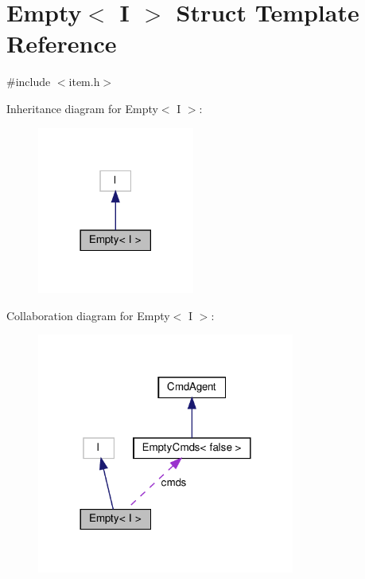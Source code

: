 \hypertarget{structEmpty}{}\section{Empty$<$ I $>$ Struct Template Reference}
\label{structEmpty}


{\ttfamily \#include $<$item.\+h$>$}



Inheritance diagram for Empty$<$ I $>$\+:\nopagebreak
\begin{figure}[H]
\begin{center}
\leavevmode
\includegraphics[width=146pt]{structEmpty__inherit__graph}
\end{center}
\end{figure}


Collaboration diagram for Empty$<$ I $>$\+:\nopagebreak
\begin{figure}[H]
\begin{center}
\leavevmode
\includegraphics[width=240pt]{structEmpty__coll__graph}
\end{center}
\end{figure}
